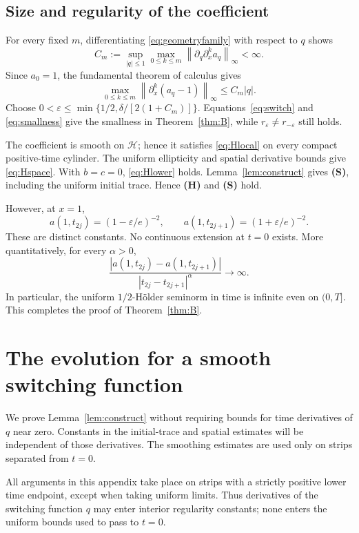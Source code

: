 \documentclass[11pt,reqno]{amsart}
\numberwithin{equation}{section}
\theoremstyle{definition}
\theoremstyle{remark}
\newcommand{\HH}{\mathcal H}
\newcommand{\norm}[1]{\left\lVert#1\right\rVert}
\begin{document}
\subsection{Size and regularity of the coefficient}
For every fixed $m$, differentiating \eqref{eq:geometryfamily} with respect to $q$ shows
\[
 C_m:=\sup_{|q|\leq1}\max_{0\leq k\leq m}
 \norm{\partial_q\partial_x^k a_q}_\infty<\infty.
\]
Since $a_0=1$, the fundamental theorem of calculus gives
\begin{equation}\label{eq:smallness}
 \max_{0\leq k\leq m}\norm{\partial_x^k(a_q-1)}_\infty
 \leq C_m|q|.
\end{equation}
Choose $0<\varepsilon\leq\min\{1/2,\delta/[2(1+C_m)]\}$. Equations~\eqref{eq:switch} and \eqref{eq:smallness} give the smallness in Theorem~\ref{thm:B}, while $r_\varepsilon\neq r_{-\varepsilon}$ still holds.

The coefficient is smooth on $\HH$; hence it satisfies \eqref{eq:Hlocal} on every compact positive-time cylinder. The uniform ellipticity and spatial derivative bounds give \eqref{eq:Hspace}. With $b=c=0$, \eqref{eq:Hlower} holds. Lemma~\ref{lem:construct} gives \textbf{(S)}, including the uniform initial trace. Hence \textbf{(H)} and \textbf{(S)} hold.

However, at $x=1$,
\begin{equation}\label{eq:nolimit}
 a(1,t_{2j})=(1-\varepsilon/e)^{-2},\qquad
 a(1,t_{2j+1})=(1+\varepsilon/e)^{-2}.
\end{equation}
These are distinct constants. No continuous extension at $t=0$ exists. More quantitatively, for every $\alpha>0$,
\[
 \frac{|a(1,t_{2j})-a(1,t_{2j+1})|}
 {|t_{2j}-t_{2j+1}|^\alpha}\longrightarrow\infty.
\]
In particular, the uniform $1/2$-H\"older seminorm in time is infinite even on $(0,T]$. This completes the proof of Theorem~\ref{thm:B}.

\appendix
\section{The evolution for a smooth switching function}\label{sec:evolution}
We prove Lemma~\ref{lem:construct} without requiring bounds for time derivatives of $q$ near zero. Constants in the initial-trace and spatial estimates will be independent of those derivatives. The smoothing estimates are used only on strips separated from $t=0$.

All arguments in this appendix take place on strips with a strictly
positive lower time endpoint, except when taking uniform limits.
Thus derivatives of the switching function $q$ may enter interior
regularity constants; none enters the uniform bounds used to pass to
$t=0$.
\end{document}
